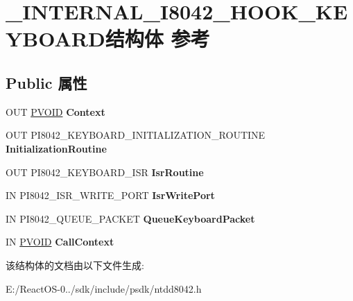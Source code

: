 \hypertarget{struct___i_n_t_e_r_n_a_l___i8042___h_o_o_k___k_e_y_b_o_a_r_d}{}\section{\+\_\+\+I\+N\+T\+E\+R\+N\+A\+L\+\_\+\+I8042\+\_\+\+H\+O\+O\+K\+\_\+\+K\+E\+Y\+B\+O\+A\+R\+D结构体 参考}
\label{struct___i_n_t_e_r_n_a_l___i8042___h_o_o_k___k_e_y_b_o_a_r_d}
\subsection*{Public 属性}
\begin{DoxyCompactItemize}
\item 
\mbox{\label{struct___i_n_t_e_r_n_a_l___i8042___h_o_o_k___k_e_y_b_o_a_r_d_abc85f5996254730843fe7ea760e2c220}} 
O\+UT \hyperlink{interfacevoid}{P\+V\+O\+ID} {\bfseries Context}
\item 
\mbox{\label{struct___i_n_t_e_r_n_a_l___i8042___h_o_o_k___k_e_y_b_o_a_r_d_af00e543ea63deb786cebf27aba7a2e46}} 
O\+UT P\+I8042\+\_\+\+K\+E\+Y\+B\+O\+A\+R\+D\+\_\+\+I\+N\+I\+T\+I\+A\+L\+I\+Z\+A\+T\+I\+O\+N\+\_\+\+R\+O\+U\+T\+I\+NE {\bfseries Initialization\+Routine}
\item 
\mbox{\label{struct___i_n_t_e_r_n_a_l___i8042___h_o_o_k___k_e_y_b_o_a_r_d_a426bf416101fb751aade0e2021806fd7}} 
O\+UT P\+I8042\+\_\+\+K\+E\+Y\+B\+O\+A\+R\+D\+\_\+\+I\+SR {\bfseries Isr\+Routine}
\item 
\mbox{\label{struct___i_n_t_e_r_n_a_l___i8042___h_o_o_k___k_e_y_b_o_a_r_d_abef2cbe481b1125c23d24a105e8ee529}} 
IN P\+I8042\+\_\+\+I\+S\+R\+\_\+\+W\+R\+I\+T\+E\+\_\+\+P\+O\+RT {\bfseries Isr\+Write\+Port}
\item 
\mbox{\label{struct___i_n_t_e_r_n_a_l___i8042___h_o_o_k___k_e_y_b_o_a_r_d_ad8ffb4504e2f4a0bb6bb2262e2fd24da}} 
IN P\+I8042\+\_\+\+Q\+U\+E\+U\+E\+\_\+\+P\+A\+C\+K\+ET {\bfseries Queue\+Keyboard\+Packet}
\item 
\mbox{\label{struct___i_n_t_e_r_n_a_l___i8042___h_o_o_k___k_e_y_b_o_a_r_d_a90922055afd0e56bd33d62655a3f1e7a}} 
IN \hyperlink{interfacevoid}{P\+V\+O\+ID} {\bfseries Call\+Context}
\end{DoxyCompactItemize}


该结构体的文档由以下文件生成\+:\begin{DoxyCompactItemize}
\item 
E\+:/\+React\+O\+S-\/0../sdk/include/psdk/ntdd8042.\+h\end{DoxyCompactItemize}
